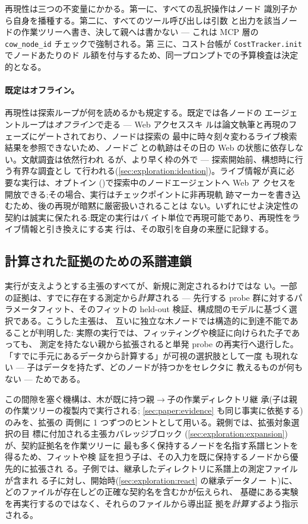 再現性は三つの不変量にかかる。第一に、すべての乱択操作はノード
識別子から自身を播種する。第二に、すべてのツール呼び出しは引数
と出力を該当ノードの作業ツリーへ書き、決して親へは書かない —
これは MCP 層の \texttt{cow\_node\_id} チェックで強制される。第
三に、コスト台帳が \texttt{CostTracker.init} でノードあたりのド
ル額を付与するため、同一プロンプトでの予算検査は決定的となる。

\paragraph{既定はオフライン。}
再現性は探索ループが何を読めるかも規定する。既定では各ノードの
エージェントループは\emph{オフライン}で走る — Web アクセススキ
ルは論文執筆と再現のフェーズにゲートされており、ノードは探索の
最中に時々刻々変わるライブ検索結果を参照できないため、ノードご
との軌跡はその日の Web の状態に依存しない。文献調査は依然行われ
るが、より早く枠の外で — 探索開始前、構想時に行う有界な調査とし
て行われる(\cref{sec:exploration:ideation})。ライブ情報が真に必
要な実行は、オプトイン
()で探索中のノードエージェントへ Web ア
クセスを開放できる;その場合、実行はチェックポイントに非再現軌
跡マーカーを書き込むため、後の再現が暗黙に厳密扱いされることは
ない。いずれにせよ決定性の契約は誠実に保たれる:既定の実行はバ
イト単位で再現可能であり、再現性をライブ情報と引き換えにする実
行は、その取引を自身の来歴に記録する。

\subsection{計算された証拠のための系譜連鎖}\label{sec:exploration:lineage-chaining}

実行が支えようとする主張のすべてが、新規に測定されるわけではな
い。一部の証拠は、すでに存在する測定から\emph{計算}される —
先行する probe 群に対するパラメータフィット、そのフィットの
held-out 検証、構成間のモデルに基づく選択である。こうした主張は、
互いに独立な木ノードでは構造的に到達不能であることが判明した:
実際の実行では、フィッティングや検証に向けられた子であっても、
測定を持たない親から拡張されると単発 probe の再実行へ退行した。
「すでに手元にあるデータから計算する」が可視の選択肢として一度
も現れない — 子はデータを持たず、どのノードが持つかをセレクタに
教えるものが何もない — ためである。

この間隙を塞ぐ機構は、木が既に持つ親$\to$子の作業ディレクトリ継
承(子は親の作業ツリーの複製内で実行される;
\cref{sec:paper:evidence} も同じ事実に依拠する)のみを、拡張の
両側に 1 つずつのヒントとして用いる。親側では、拡張対象選択の目
標に付加される主張カバレッジブロック
(\cref{sec:exploration:expansion})が、契約証拠名を作業ツリーに
最も多く保持するノードを名指す系譜ヒントを得るため、フィットや検
証を担う子は、その入力を既に保持するノードから優先的に拡張され
る。子側では、継承したディレクトリに系譜上の測定ファイルが含まれ
る子に対し、開始時(\cref{sec:exploration:react} の継承データノー
ト)に、どのファイルが存在しどの正確な契約名を含むかが伝えられ、
基礎にある実験を再実行するのではなく、それらのファイルから導出証
拠を\emph{計算する}よう指示される。

